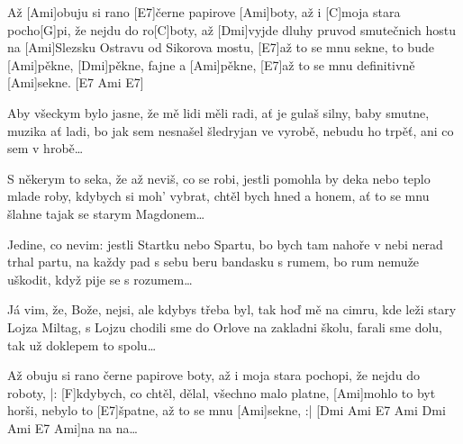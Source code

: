 
\sloka
Až [Ami]obuju si rano [E7]černe papirove [Ami]boty,
až i [C]moja stara pocho[G]pi, že nejdu do ro[C]boty,
až [Dmi]vyjde dluhy pruvod smutečnich hostu
na [Ami]Slezsku Ostravu od Sikorova mostu,
[E7]až to se mnu sekne, to bude [Ami]pěkne,
[Dmi]pěkne, fajne a [Ami]pěkne, [E7]až to se mnu definitivně [Ami]sekne. [E7 Ami E7]

\sloka
Aby všeckym bylo jasne, že mě lidi měli radi,
ať je gulaš silny, baby smutne, muzika ať ladi,
bo jak sem nesnašel šledryjan ve vyrobě,
nebudu ho trpěť, ani co sem v hrobě…

\sloka
S někerym to seka, že až neviš, co se robi,
jestli pomohla by deka nebo teplo mlade roby,
kdybych si moh’ vybrat, chtěl bych hned a honem,
ať to se mnu šlahne tajak se starym Magdonem…

\sloka
Jedine, co nevim: jestli Startku nebo Spartu,
bo bych tam nahoře v nebi nerad trhal partu,
na každy pad s sebu beru bandasku s rumem,
bo rum nemuže uškodit, když pije se s rozumem…

\sloka
Já vim, že, Bože, nejsi, ale kdybys třeba byl, tak
hoď mě na cimru, kde leži stary Lojza Miltag,
s Lojzu chodili sme do Orlove na zakladni školu,
farali sme dolu, tak už doklepem to spolu…

\sloka
Až obuju si rano černe papirove boty,
až i moja stara pochopi, že nejdu do roboty,
|: [F]kdybych, co chtěl, dělal, všechno malo platne,
[Ami]mohlo to byt horši, nebylo to [E7]špatne,
až to se mnu [Ami]sekne, :|
[Dmi Ami E7 Ami Dmi Ami E7 Ami]na na na…

